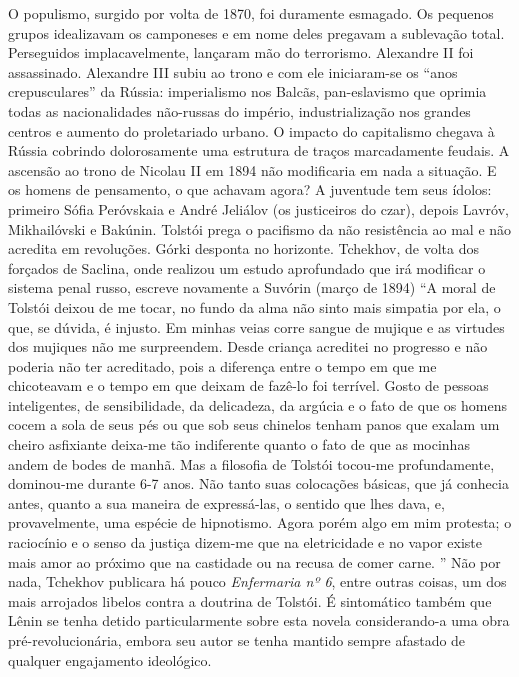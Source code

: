 O populismo, surgido por volta de 1870, foi duramente esmagado. Os
pequenos grupos idealizavam os camponeses e em nome deles pregavam a
sublevação total. Perseguidos implacavelmente, lançaram mão do
terrorismo. Alexandre II foi assassinado. Alexandre III subiu ao trono e
com ele iniciaram-se os ``anos crepusculares'' da Rússia: imperialismo
nos Balcãs, pan-eslavismo que oprimia todas as nacionalidades não-russas
do império, industrialização nos grandes centros e aumento do
proletariado urbano. O impacto do capitalismo chegava à Rússia cobrindo
dolorosamente uma estrutura de traços marcadamente feudais. A ascensão
ao trono de Nicolau II em 1894 não modificaria em nada a situação. E os
homens de pensamento, o que achavam agora? A juventude tem seus ídolos:
primeiro Sófia Peróvskaia e André Jeliálov (os justiceiros do czar),
depois Lavróv, Mikhailóvski e Bakúnin. Tolstói prega o pacifismo da não
resistência ao mal e não acredita em revoluções. Górki desponta no
horizonte. Tchekhov, de volta dos forçados de Saclina, onde realizou um
estudo aprofundado que irá modificar o sistema penal russo, escreve
novamente a Suvórin (março de 1894) ``A moral de Tolstói deixou de me
tocar, no fundo da alma não sinto mais simpatia por ela, o que, se
dúvida, é injusto. Em minhas veias corre sangue de mujique e as virtudes
dos mujiques não me surpreendem. Desde criança acreditei no progresso e
não poderia não ter acreditado, pois a diferença entre o tempo em que me
chicoteavam e o tempo em que deixam de fazê-lo foi terrível. Gosto de
pessoas inteligentes, de sensibilidade, da delicadeza, da argúcia e o
fato de que os homens cocem a sola de seus pés ou que sob seus chinelos
tenham panos que exalam um cheiro asfixiante deixa-me tão indiferente
quanto o fato de que as mocinhas andem de bodes de manhã. Mas a
filosofia de Tolstói tocou-me profundamente, dominou-me durante 6-7
anos. Não tanto suas colocações básicas, que já conhecia antes, quanto a
sua maneira de expressá-las, o sentido que lhes dava, e, provavelmente,
uma espécie de hipnotismo. Agora porém algo em mim protesta; o
raciocínio e o senso da justiça dizem-me que na eletricidade e no vapor
existe mais amor ao próximo que na castidade ou na recusa de comer
carne. '' Não por nada, Tchekhov publicara há pouco \emph{Enfermaria nº
6}, entre outras coisas, um dos mais arrojados libelos contra a doutrina
de Tolstói. É sintomático também que Lênin se tenha detido
particularmente sobre esta novela considerando-a uma obra
pré-revolucionária, embora seu autor se tenha mantido sempre afastado de
qualquer engajamento ideológico.

